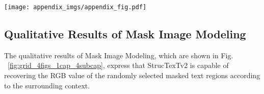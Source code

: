 \documentclass{article} \usepackage{iclr2023_conference,times}
\begin{document}
\begin{table}[ht]
\caption{Ablation study for the impacts of different thresholds used in OCR selection. The model is pre-trained with only MIM task.}
\label{table:Ablation_Threshold}
\vspace{-0.5em}
\begin{center}
\end{center}
\vspace{-0.5em}
\end{table}


\begin{figure*}
 \centering
 \texttt{[image: appendix\_imgs/appendix\_fig.pdf]}
 \caption{The qualitative results of Mask Image Modeling. From left to right: the masked document image, document reconstruction without content information from MLM, and document reconstruction with content information from MLM.}
\label{fig:grid_4figs_1cap_4subcap}
\end{figure*}

\subsection{Qualitative Results of Mask Image Modeling}
The qualitative results of Mask Image Modeling, which are shown in Fig. ~\ref{fig:grid_4figs_1cap_4subcap}, express that StrucTexTv2 is capable of recovering the RGB value of the randomly selected masked text regions according to the surrounding context.
\end{document}
